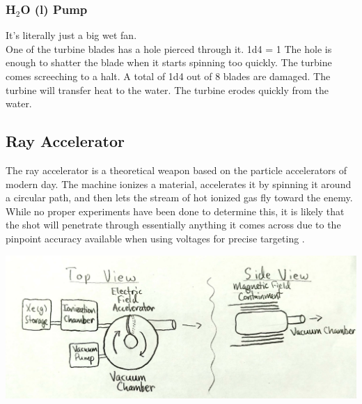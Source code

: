 \documentclass[a4paper]{article}
\begin{document}
\vspace{-0.5cm} \hspace{-18pt} \subsubsection{H$_2$O (l) Pump} \label{railgun_h2o_l_pump} \vspace{-0.2cm}
It's literally just a big wet fan.
\\ \pbhw
{One of the turbine blades has a hole pierced through it. \newline 1d4 = 1 The hole is enough to shatter the blade when it starts spinning too quickly. }
{The turbine comes screeching to a halt. A total of 1d4 out of 8 blades are damaged.}
{The turbine will transfer heat to the water.} 
{The turbine erodes quickly from the water.}


\newpage
\subsection{Ray Accelerator} \label{ray}

The ray accelerator is a theoretical weapon based on the particle accelerators of modern day. The machine ionizes a material, accelerates it by spinning it around a circular path, and then lets the stream of hot ionized gas fly toward the enemy. While no proper experiments have been done to determine this, it is likely that the shot will penetrate through essentially anything it comes across due to the pinpoint accuracy available when using voltages for precise targeting \cite{energy_weapons}.

\vspace{0.2cm}
\includegraphics[scale=0.3]{Ray_Accelerator}
\end{document}
